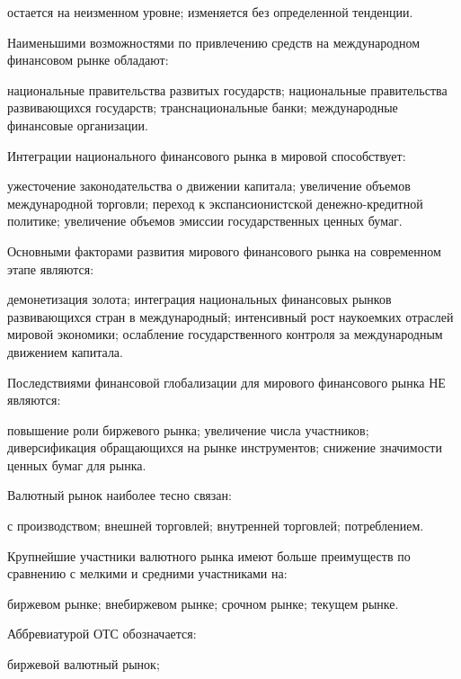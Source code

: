 \documentclass[12pt, table]{exam}
\begin{document}
\begin{questions}
\begin{multicols}{2}
\begin{choices}
	 \choice остается на неизменном уровне;
	 \choice изменяется без определенной тенденции.
	 \end{choices}
\question Наименьшими возможностями по привлечению средств на международном финансовом рынке обладают:
	 \begin{choices}
	 \choice национальные правительства развитых государств;
	 \CC национальные правительства развивающихся государств;
	 \choice транснациональные банки;
	 \choice международные финансовые организации.
	 \end{choices}
\question Интеграции национального финансового рынка в мировой способствует:
	 \begin{choices}
	 \choice ужесточение законодательства о движении капитала;
	 \choice увеличение объемов международной торговли;
	 \CC переход к экспансионистской денежно-кредитной политике;
	 \choice увеличение объемов эмиссии государственных ценных бумаг.
	 \end{choices}
\question Основными факторами развития мирового финансового рынка на современном этапе являются:
	 \begin{choices}
	 \CC демонетизация золота;
	 \choice интеграция национальных финансовых рынков развивающихся стран в международный;
	 \choice интенсивный рост наукоемких отраслей мировой экономики;
	 \choice ослабление государственного контроля за международным движением капитала.
	 \end{choices}
\question Последствиями финансовой глобализации для мирового финансового рынка НЕ являются:
	 \begin{choices}
	 \choice повышение роли биржевого рынка;
	 \choice увеличение числа участников;
	 \choice диверсификация обращающихся на рынке инструментов;
	 \CC снижение значимости ценных бумаг для рынка.
	 \end{choices}
\question Валютный рынок наиболее тесно связан:
	 \begin{choices}
	 \choice с производством;
	 \CC внешней торговлей;
	 \choice внутренней торговлей;
	 \choice потреблением.
	 \end{choices}
\question Крупнейшие участники валютного рынка имеют больше преимуществ по сравнению с мелкими и средними участниками на:
	 \begin{choices}
	 \choice биржевом рынке;
	 \CC внебиржевом рынке;
	 \choice срочном рынке;
	 \choice текущем рынке.
	 \end{choices}
\question Аббревиатурой ОТС обозначается:
	 \begin{choices}
	 \choice биржевой валютный рынок;

\end{choices}
\end{multicols}
\end{questions}
\end{document}
